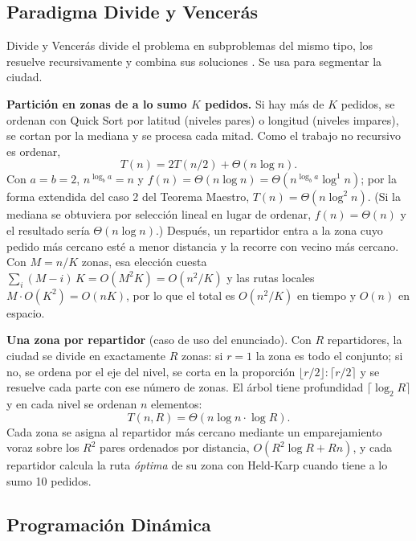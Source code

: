\subsection{Paradigma Divide y Vencerás}

Divide y Vencerás divide el problema en subproblemas del mismo tipo, los resuelve recursivamente y combina sus soluciones \citep{cormen2022introduction}. Se usa para segmentar la ciudad.

\textbf{Partición en zonas de a lo sumo $K$ pedidos.} Si hay más de $K$ pedidos, se ordenan con Quick Sort por latitud (niveles pares) o longitud (niveles impares), se cortan por la mediana y se procesa cada mitad. Como el trabajo no recursivo es ordenar,
\begin{equation}
    T(n)=2T(n/2)+\Theta(n\log n).
\end{equation}
Con $a=b=2$, $n^{\log_b a}=n$ y $f(n)=\Theta(n\log n)=\Theta(n^{\log_b a}\log^1 n)$; por la forma extendida del caso 2 del Teorema Maestro, $T(n)=\Theta(n\log^{2} n)$. (Si la mediana se obtuviera por selección lineal en lugar de ordenar, $f(n)=\Theta(n)$ y el resultado sería $\Theta(n\log n)$.) Después, un repartidor entra a la zona cuyo pedido más cercano esté a menor distancia y la recorre con vecino más cercano. Con $M=n/K$ zonas, esa elección cuesta $\sum_i (M-i)\,K=O(M^2K)=O(n^2/K)$ y las rutas locales $M\cdot O(K^2)=O(nK)$, por lo que el total es $O(n^2/K)$ en tiempo y $O(n)$ en espacio.

\textbf{Una zona por repartidor} (caso de uso del enunciado). Con $R$ repartidores, la ciudad se divide en exactamente $R$ zonas: si $r=1$ la zona es todo el conjunto; si no, se ordena por el eje del nivel, se corta en la proporción $\lfloor r/2\rfloor:\lceil r/2\rceil$ y se resuelve cada parte con ese número de zonas. El árbol tiene profundidad $\lceil\log_2 R\rceil$ y en cada nivel se ordenan $n$ elementos:
\begin{equation}
    T(n,R)=\Theta(n\log n\cdot\log R).
\end{equation}
Cada zona se asigna al repartidor más cercano mediante un emparejamiento voraz sobre los $R^2$ pares ordenados por distancia, $O(R^2\log R + Rn)$, y cada repartidor calcula la ruta \emph{óptima} de su zona con Held-Karp cuando tiene a lo sumo 10 pedidos.

\subsection{Programación Dinámica}


